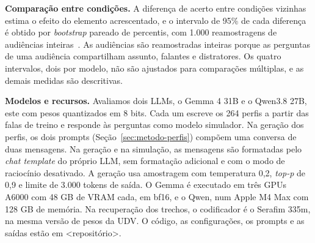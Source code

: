\textbf{Comparação entre condições.} A diferença de acerto entre condições vizinhas estima o efeito
do elemento acrescentado, e o intervalo de 95\% de cada diferença é obtido por \textit{bootstrap}
pareado de percentis, com 1.000 reamostragens de audiências inteiras~\citep{efron1993introduction}.
As audiências são reamostradas inteiras porque as perguntas de uma audiência compartilham assunto,
falantes e distratores. Os quatro intervalos, dois por modelo, não são ajustados para comparações
múltiplas, e as demais medidas são descritivas.

\textbf{Modelos e recursos.} Avaliamos dois LLMs, o Gemma 4 31B e o Qwen3.8 27B, este com pesos
quantizados em 8 bits. Cada um escreve os 264 perfis a partir das falas de treino e responde às
perguntas como modelo simulador. Na geração dos perfis, os dois prompts
(Seção~\ref{sec:metodo-perfis}) compõem uma conversa de duas mensagens. Na geração e na simulação, as
mensagens são formatadas pelo \textit{chat template} do próprio LLM, sem formatação adicional e com o
modo de raciocínio desativado. A geração usa amostragem com temperatura 0,2, \textit{top-p} de 0,9 e
limite de 3.000 tokens de saída. O Gemma é executado em três GPUs A6000 com 48 GB de VRAM cada, em
bf16, e o Qwen, num Apple M4 Max com 128 GB de memória. Na recuperação dos trechos, o codificador é o
Serafim 335m, na mesma versão de pesos da UDV. O código, as configurações, os prompts e as saídas
estão em <repositório>.
